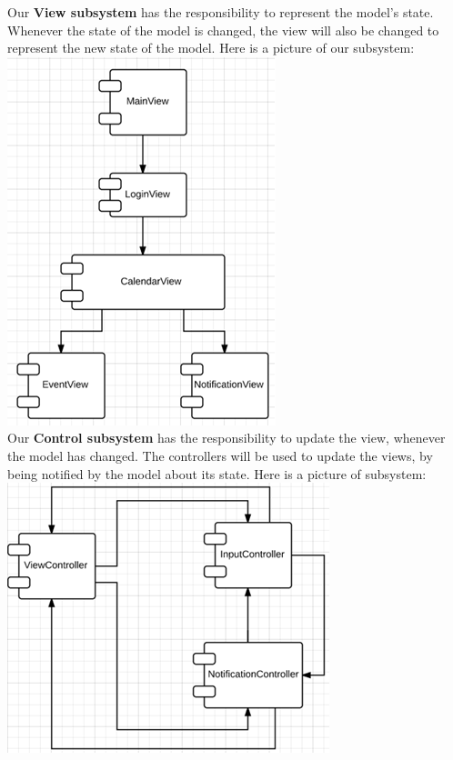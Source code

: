 \pagebreak

Our \textbf{View subsystem} has the responsibility to represent the model’s state. Whenever the state of the model is changed, the view will also be changed to represent the new state of the model. Here is a picture of our subsystem:\\
\includegraphics[scale=0.8]{viewSubsystem}
\\

Our \textbf{Control subsystem} has the responsibility to update the view, whenever the model has changed. The controllers will be used to update the views, by being notified by the model about its state. Here is a picture of subsystem:\\
\includegraphics[scale=0.8]{controlSubsystem}

\pagebreak

